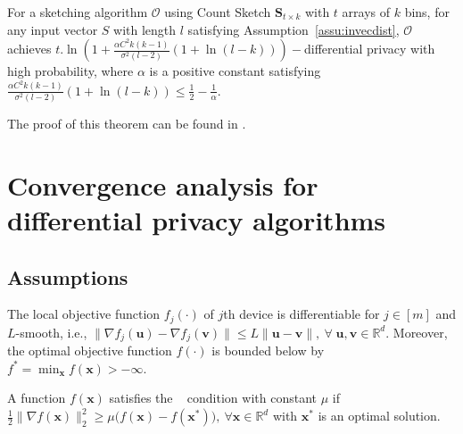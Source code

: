
\begin{theorem}
For a sketching algorithm $\mathcal{O}$ using Count Sketch $\mathbf{S}_{t\times k}$ with $t$ arrays of $k$ bins, for any input vector $S$ with length $l$ satisfying Assumption~\ref{assu:invecdist}, $\mathcal{O}$ achieves $t.\ln \left(1+\frac{\alpha C^2 k(k-1)}{\sigma^2(l-2)}(1+\ln(l-k) )\right)-$differential privacy with high probability, where $\alpha$ is a positive constant satisfying $\frac{\alpha C^2 k(k-1)}{\sigma^2(l-2)}(1+\ln(l-k) )\leq \frac{1}{2}-\frac{1}{\alpha}$.
\end{theorem}
The proof of this theorem can be found in \cite{li2019privacy}.

\section{Convergence analysis for differential privacy algorithms}

\subsection{Assumptions}


\begin{assumption}\label{Assu:1}
The local objective function $f_j(\cdot)$ of $j$th device is differentiable for $j\in [m]$ and $L$-smooth, i.e., $\|\nabla f_j(\boldsymbol{u})-\nabla f_j(\mathbf{v})\|\leq L\|\boldsymbol{u}-\mathbf{v}\|,\: \forall \;\boldsymbol{u},\mathbf{v}\in\mathbb{R}^d$. Moreover, the optimal objective function $f(\cdot)$ is bounded below by ${f^*} = \min_{\boldsymbol{x}} f(\boldsymbol{x})>-\infty$. 
\end{assumption}

\begin{assumption}[\pl]\label{assum:pl}
A function $f(\boldsymbol{x})$ satisfies the \pl~ condition with constant $\mu$ if $\frac{1}{2}\|\nabla f(\boldsymbol{x})\|_2^2\geq \mu\big(f(\boldsymbol{x})-f(\boldsymbol{x}^*)\big),\: \forall \boldsymbol{x}\in\mathbb{R}^d $ with $\boldsymbol{x}^*$ is an optimal solution.
\end{assumption}

